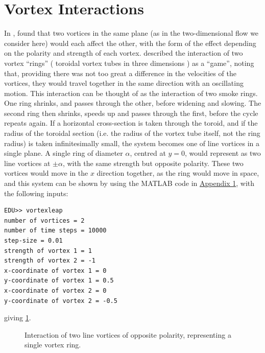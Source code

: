 \documentclass[10pt, a4paper]{article}
\numberwithin{equation}{section}
\begin{document}
\section{Vortex Interactions}\label{sec:vortint}
In \citeyear{helmholtz67}, \citeauthor{helmholtz67} found that two vortices in the same plane (as in the two-dimensional flow we consider here) would each affect the other, with the form of the effect depending on the polarity and strength of each vortex.
\citeauthor{helmholtz67} described the interaction of two vortex ``rings'' ( toroidal vortex tubes in three dimensions \citep{saffman92}) as a ``game'', noting that, providing there was not too great a difference in the velocities of the vortices, they would travel together in the same direction with an oscillating motion.
This interaction can be thought of as the interaction of two smoke rings.
One ring shrinks, and passes through the other, before widening and slowing.
The second ring then shrinks, speeds up and passes through the first, before the cycle repeats again.
If a horizontal cross-section is taken through the toroid, and if the radius of the toroidal section (i.e. the radius of the vortex tube itself, not the ring radius) is taken infinitesimally small, the system becomes one of line vortices in a single plane. 
A single ring of diameter $\alpha$, centred at $y=0$, would represent as two line vortices at $\pm\alpha$, with the same strength but opposite polarity.
These two vortices would move in the $x$ direction together, as the ring would move in space, and this system can be shown by using the MATLAB code in \hyperref[sec:ap1]{Appendix 1}, with the following inputs:
\begin{verbatim}
EDU>> vortexleap
number of vortices = 2
number of time steps = 10000
step-size = 0.01
strength of vortex 1 = 1
strength of vortex 2 = -1
x-coordinate of vortex 1 = 0
y-coordinate of vortex 1 = 0.5
x-coordinate of vortex 2 = 0
y-coordinate of vortex 2 = -0.5
\end{verbatim}
giving \cref{fig:2vort}.
\begin{figure}[ht]
\centering
\newlength\figureheight 
\newlength\figurewidth 
\setlength\figureheight{10cm} 
\setlength\figurewidth{\textwidth}

\caption{Interaction of two line vortices of opposite polarity, representing a single vortex ring.}
\label{fig:2vort}
\end{figure}
\end{document}
